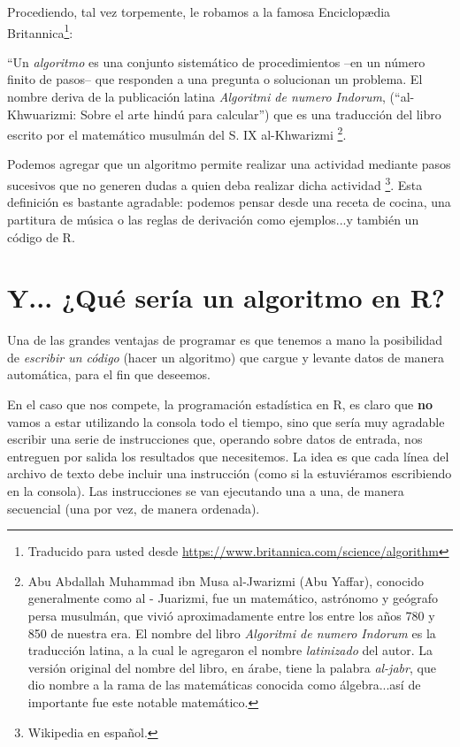 \documentclass[11pt,a4paper]{article}
\begin{document}
Procediendo, tal vez torpemente, le robamos a la famosa Enciclop\ae dia Britannica\footnote{Traducido para usted desde \url{https://www.britannica.com/science/algorithm}}:

``Un \textit{algoritmo} es una conjunto sistemático de procedimientos --en un número finito de pasos-- que responden a una pregunta  o solucionan un problema. El nombre deriva de la publicación latina \textit{Algoritmi de numero Indorum}, (``al-Khwuarizmi: Sobre el arte hindú para calcular'') que es una traducción del libro escrito por el matemático musulmán del S. IX  al-Khwarizmi \footnote{Abu Abdallah Muhammad ibn Musa al-Jwarizmi (Abu Yaffar), conocido generalmente como al - Juarizmi, fue un matemático, astrónomo y geógrafo persa musulmán, que vivió aproximadamente entre los entre los años 780 y 850 de nuestra era. El nombre del libro \textit{Algoritmi de numero Indorum} es la traducción latina, a la cual le agregaron el nombre \textit{latinizado} del autor. La versión original del nombre del libro, en árabe, tiene la palabra \textit{al-jabr}, que dio nombre a la rama de las matemáticas conocida como álgebra...así de importante fue este notable matemático.}.

Podemos agregar que un algoritmo permite realizar una actividad mediante pasos sucesivos que no generen dudas a quien deba realizar dicha actividad \footnote{Wikipedia en español.}. Esta definición es bastante agradable: podemos pensar desde una receta de cocina, una partitura de música o las reglas de derivación como ejemplos...y también un código de R.


\section{Y... ¿Qué sería un algoritmo en R?}

Una de las grandes ventajas de programar es que tenemos a mano la posibilidad de \textit{escribir un código} (hacer un algoritmo) que cargue y levante datos de manera automática, para el fin que deseemos.

En el caso que nos compete, la programación estadística en R, es claro que \textbf{no} vamos a estar utilizando la consola todo el tiempo, sino que sería muy agradable escribir una serie de instrucciones que, operando sobre datos de entrada, nos entreguen por salida los resultados que necesitemos. La idea es que cada línea del archivo de texto debe incluir una instrucción (como si la estuviéramos escribiendo en la consola). Las instrucciones se van ejecutando una a una, de manera secuencial (una por vez, de manera ordenada).
\end{document}
